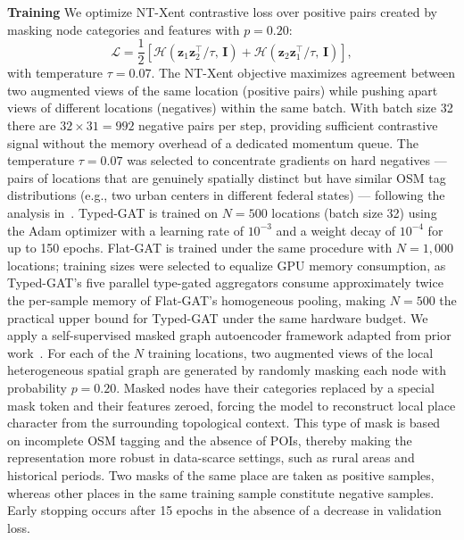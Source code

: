 \documentclass[]{interact}
\theoremstyle{plain}%
\theoremstyle{definition}
\theoremstyle{remark}
\begin{document}
\textbf{Training} We optimize NT-Xent contrastive loss over positive pairs created by masking node categories and features with $p=0.20$:
\begin{equation}
\mathcal{L} = \frac{1}{2}\!\left[ \mathcal{H}(\mathbf{z}_1 \mathbf{z}_2^\top / \tau,\,\mathbf{I}) + \mathcal{H}(\mathbf{z}_2 \mathbf{z}_1^\top / \tau,\,\mathbf{I}) \right],
\label{eq:infonce}
\end{equation}
with temperature $\tau=0.07$. The NT-Xent objective maximizes agreement between two augmented views of the same location (positive pairs) while pushing apart views of different locations (negatives) within the same batch. With batch size 32 there are $32 \times 31 = 992$ negative pairs per step, providing sufficient contrastive signal without the memory overhead of a dedicated momentum queue. The temperature $\tau=0.07$ was selected to concentrate gradients on hard negatives --- pairs of locations that are genuinely spatially distinct but have similar OSM tag distributions (e.g., two urban centers in different federal states) --- following the analysis in~\citep{DBLP:journals/corr/abs-2002-05709}. Typed-GAT is trained on $N=500$ locations (batch size 32) using the Adam optimizer with a learning rate of $10^{-3}$ and a weight decay of $10^{-4}$ for up to 150 epochs. Flat-GAT is trained under the same procedure with $N=1{,}000$ locations; training sizes were selected to equalize GPU memory consumption, as Typed-GAT's five parallel type-gated aggregators consume approximately twice the per-sample memory of Flat-GAT's homogeneous pooling, making $N=500$ the practical upper bound for Typed-GAT under the same hardware budget. We apply a self-supervised masked graph autoencoder framework adapted from prior work~\citep{hou2022graphmaeselfsupervisedmaskedgraph}. For each of the $N$ training locations, two augmented views of the local heterogeneous spatial graph are generated by randomly masking each node with probability $p=0.20$. Masked nodes have their categories replaced by a special mask token and their features zeroed, forcing the model to reconstruct local place character from the surrounding topological context. This type of mask is based on incomplete OSM tagging and the absence of POIs, thereby making the representation more robust in data-scarce settings, such as rural areas and historical periods. Two masks of the same place are taken as positive samples, whereas other places in the same training sample constitute negative samples. Early stopping occurs after 15 epochs in the absence of a decrease in validation loss.
\end{document}
